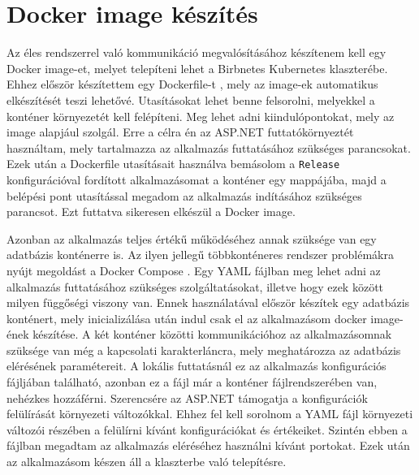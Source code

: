 \chapter{Docker image készítés}
\label{chapt:birdmap-kubernetes}
Az éles rendszerrel való kommunikáció megvalósításához készítenem kell egy Docker image-et, melyet telepíteni lehet a Birbnetes Kubernetes klaszterébe.
Ehhez először készítettem egy Dockerfile-t \cite{dockerfile}, mely az image-ek automatikus elkészítését teszi lehetővé.
Utasításokat lehet benne felsorolni, melyekkel a konténer környezetét kell felépíteni.
Meg lehet adni kiindulópontokat, mely az image alapjául szolgál.
Erre a célra én az ASP.NET futtatókörnyeztét használtam, mely tartalmazza az alkalmazás futtatásához szükséges parancsokat.
Ezek után a Dockerfile utasításait használva bemásolom a \verb+Release+ konfigurációval fordított alkalmazásomat a konténer egy mappájába, 
majd a belépési pont utasítással megadom az alkalmazás indításához szükséges parancsot.
Ezt futtatva sikeresen elkészül a Docker image.

Azonban az alkalmazás teljes értékű működéséhez annak szüksége van egy adatbázis konténerre is.
Az ilyen jellegű többkonténeres rendszer problémákra nyújt megoldást a Docker Compose \cite{docker-compose}.
Egy YAML fájlban meg lehet adni az alkalmazás futtatásához szükséges szolgáltatásokat, illetve hogy ezek között milyen függőségi viszony van.
Ennek használatával először készítek egy adatbázis konténert, mely inicializálása után indul csak el az alkalmazásom docker image-ének készítése.
A két konténer közötti kommunikációhoz az alkalmazásomnak szüksége van még a kapcsolati karakterláncra, mely meghatározza az adatbázis elérésének paramétereit.
A lokális futtatásnál ez az alkalmazás konfigurációs fájljában található, azonban ez a fájl már a konténer fájlrendszerében van, nehézkes hozzáférni.
Szerencsére az ASP.NET támogatja a konfigurációk felülírását környezeti változókkal.
Ehhez fel kell sorolnom a YAML fájl környezeti változói részében a felülírni kívánt konfigurációkat és értékeiket.
Szintén ebben a fájlban megadtam az alkalmazás eléréséhez használni kívánt portokat.
Ezek után az alkalmazásom készen áll a klaszterbe való telepítésre.